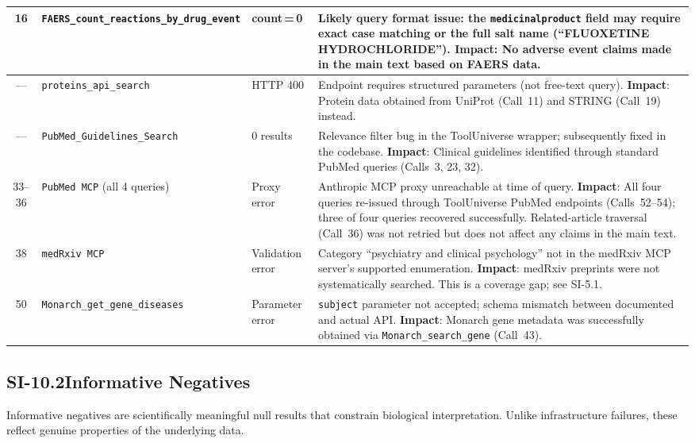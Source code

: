 \begin{longtable}{@{}c p{3.0cm} p{3.5cm} p{5.5cm}@{}}
16 &
\texttt{FAERS\_count\_\allowbreak reactions\_by\_\allowbreak drug\_event} &
count\,=\,0 &
Likely query format issue: the \texttt{medicinalproduct} field may require
exact case matching or the full salt name (``FLUOXETINE HYDROCHLORIDE'').
\textbf{Impact}: No adverse event claims made in the main text based on FAERS
data. \\
\midrule

--- &
\texttt{proteins\_api\_\allowbreak search} &
HTTP 400 &
Endpoint requires structured parameters (not free-text query).
\textbf{Impact}: Protein data obtained from UniProt (Call~11) and STRING
(Call~19) instead. \\
\midrule

--- &
\texttt{PubMed\_Guidelines\_\allowbreak Search} &
0 results &
Relevance filter bug in the ToolUniverse wrapper; subsequently fixed in the
codebase.  \textbf{Impact}: Clinical guidelines identified through standard
PubMed queries (Calls~3, 23, 32). \\
\midrule

33--36 &
\texttt{PubMed MCP} (all 4 queries) &
Proxy error &
Anthropic MCP proxy unreachable at time of query.
\textbf{Impact}: All four queries re-issued through ToolUniverse PubMed
endpoints (Calls~52--54); three of four queries recovered successfully.
Related-article traversal (Call~36) was not retried but does not affect any
claims in the main text. \\
\midrule

38 &
\texttt{medRxiv MCP} &
Validation error &
Category ``psychiatry and clinical psychology'' not in the medRxiv MCP
server's supported enumeration.  \textbf{Impact}: medRxiv preprints were not
systematically searched.  This is a coverage gap; see SI-5.1. \\
\midrule

50 &
\texttt{Monarch\_get\_\allowbreak gene\_diseases} &
Parameter error &
\texttt{subject} parameter not accepted; schema mismatch between documented
and actual API.  \textbf{Impact}: Monarch gene metadata was successfully
obtained via \texttt{Monarch\_search\_gene} (Call~43). \\

\end{longtable}

\subsection*{SI-10.2\quad Informative Negatives}

Informative negatives are scientifically meaningful null results that
constrain biological interpretation.  Unlike infrastructure failures, these
reflect genuine properties of the underlying data.

